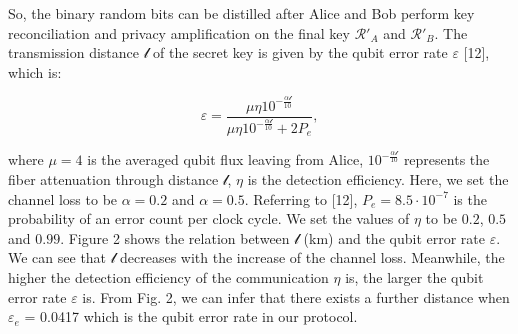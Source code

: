 \documentclass[a4paper,11pt]{article}
\begin{document}
So, the binary random bits can be distilled after Alice and Bob perform key reconciliation and privacy amplification on the final key $\mathcal{R}'_A$ and $\mathcal{R}'_B$. The transmission distance $\mathcal{l}$ of the secret key is given by the qubit error rate $\varepsilon$ [12], which is:

\begin{equation*}
\varepsilon = \dfrac{\mu \eta 10^{- \frac{\alpha \mathcal{l}}{10}}}{\mu \eta 10^{- \frac{\alpha \mathcal{l}}{10}} + 2P_e}, 
\end{equation*}

where $\mu = 4$ is the averaged qubit flux leaving from Alice, $10^{- \frac{\alpha \mathcal{l}}{10}}$ represents the fiber attenuation through distance $\mathcal{l}$,
$\eta$ is the detection efficiency. Here, we set the channel loss to be $\alpha = 0.2$ and
$\alpha = 0.5$. Referring to [12], $P_e = 8.5 \cdot 10^{−7}$ is the probability of an error count per clock cycle. We set the values of $\eta$ to be $0.2$, $0.5$ and $0.99$.
Figure 2 shows the relation between $\mathcal{l}$ (km) and the qubit error rate $\varepsilon$. We can see that $\mathcal{l}$ decreases with the increase of the channel loss. Meanwhile, the higher the detection efficiency of the communication $\eta$ is, the larger the qubit error rate $\varepsilon$ is. From Fig. 2, we can infer that there exists a further distance when $\varepsilon_e$ = 0.0417 which is the qubit error rate in our protocol.
\end{document}
